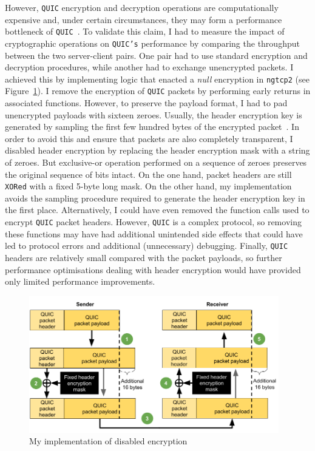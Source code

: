 \documentclass[12pt,a4paper]{report}
\begin{document}
However, \texttt{QUIC} encryption and decryption operations are computationally expensive and, under certain circumstances, they may form a performance bottleneck of \texttt{QUIC}~\cite{Making_QUIC_Quicker}.
To validate this claim, I had to measure the impact of cryptographic operations on \texttt{QUIC's} performance by comparing the throughput between the two server-client pairs.
One pair had to use standard encryption and decryption procedures, while another had to exchange unencrypted packets.
I achieved this by implementing logic that enacted a \textit{null} encryption in \texttt{ngtcp2} (see Figure~\ref{fig:my_implementation_of_cryptographic_procedures_of_quic}).
I remove the encryption of \texttt{QUIC} packets by performing early returns in associated functions.
However, to preserve the payload format, I had to pad unencrypted payloads with sixteen zeroes.
Usually, the header encryption key is generated by sampling the first few hundred bytes of the encrypted packet~\cite[Section 5.4.1]{ietf-quic-tls-32}. 
In order to avoid this and ensure that packets are also completely transparent, I disabled header encryption by replacing the header encryption mask with a string of zeroes.
But exclusive-or operation performed on a sequence of zeroes preserves the original sequence of bits intact.
On the one hand, packet headers are still \texttt{XORed} with a fixed 5-byte long mask.
On the other hand, my implementation avoids the sampling procedure required to generate the header encryption key in the first place.
Alternatively, I could have even removed the function calls used to encrypt \texttt{QUIC} packet headers.
However, \texttt{QUIC} is a complex protocol, so removing these functions may have had additional unintended side effects that could have led to protocol errors and additional (unnecessary) debugging.
Finally, \texttt{QUIC} headers are relatively small compared with the packet payloads, so further performance optimisations dealing with header encryption would have provided only limited performance improvements.


    \begin{figure}[H]
    \centering
    \includegraphics[width=0.97\textwidth]{figs/my_implementation_of_cryptographic_procedures_of_quic.png}
    \caption[My implementation of disabled encryption]{My implementation of disabled encryption}
    \label{fig:my_implementation_of_cryptographic_procedures_of_quic}
    \end{figure}
\end{document}
